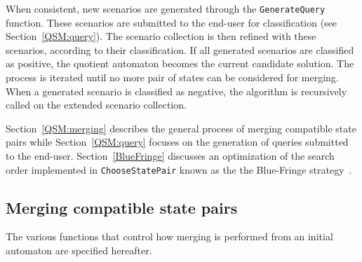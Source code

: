 When consistent, new scenarios are generated through the \texttt{GenerateQuery} function. These scenarios are submitted to the end-user for classification (see Section~\ref{QSM:query}). The scenario collection is then refined with these scenarios, according to their classification. If all generated scenarios are classified as positive, the quotient automaton becomes the current candidate solution. The process is iterated until no more pair of states can be considered for merging. When a generated scenario is classified as negative, the algorithm is recursively called on the extended scenario collection.

Section~\ref{QSM:merging} describes the general process of merging compatible state pairs while Section~\ref{QSM:query} focuses on the generation of queries submitted to the end-user. Section~\ref{BlueFringe} discusses an optimization of the search order implemented in \texttt{ChooseStatePair} known as the the Blue-Fringe strategy~\cite{Lang:1998}.

\subsection{Merging compatible state pairs\label{QSM:merging}}

The various functions that control how merging is performed from an initial automaton are specified hereafter. 

